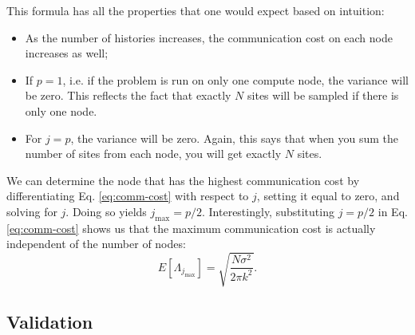 This formula has all the properties that one would expect based on
intuition:
\begin{itemize}
\item As the number of histories increases, the communication cost on
  each node increases as well;
\item If $p=1$, i.e. if the problem is run on only one compute node,
  the variance will be zero. This reflects the fact that exactly $N$
  sites will be sampled if there is only one node.
\item For $j=p$, the variance will be zero. Again, this says that when
  you sum the number of sites from each node, you will get exactly $N$
  sites.
\end{itemize}
We can determine the node that has the highest communication cost by
differentiating Eq. \ref{eq:comm-cost} with respect to $j$, setting it
equal to zero, and solving for $j$. Doing so yields $j_{\text{max}} =
p/2$. Interestingly, substituting $j = p/2$ in Eq. \ref{eq:comm-cost}
shows us that the maximum communication cost is actually independent
of the number of nodes:
\begin{equation}
  E \left [ \Lambda_{j_{\text{max}}} \right ] = \sqrt{
    \frac{N\sigma^2}{2\pi k^2}}.
\end{equation}

\subsection{Validation}

